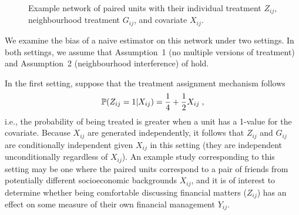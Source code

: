 \documentclass[10pt]{article}
\begin{document}
\begin{figure}[ht]
\centering
{}
\caption{\todo Example network of paired units with their individual treatment $Z_{ij}$, neighbourhood treatment $G_{ij}$, and covariate $X_{ij}$.}
\label{fig:example}
\end{figure}

We examine the bias of a naive estimator on this network under two settings. In both settings, we assume that Assumption~1 (no multiple versions of treatment) and Assumption~2 (neighbourhood interference) of \textcite{Forastiere:2021} hold.

\iffalse
In the first setting, suppose that the treatment assignment mechanism follows
\[
\P(Z_{ij}=1|X_{ij}) = \frac{1}{4} + \frac{1}{2}X_{ij} \;,
\]
i.e., the probability of being treated is greater when a unit has a 1-value for the covariate.
Because $X_{ij}$ are generated independently, it follows that $Z_{ij}$ and $G_{ij}$ are conditionally independent given $X_{ij}$ in this setting (they are independent unconditionally regardless of $X_{ij}$). An example study corresponding to this setting may be one where the paired units correspond to a pair of friends from potentially different socioeconomic backgrounds $X_{ij}$, and it is of interest to determine whether being comfortable discussing financial matters ($Z_{ij}$) has an effect on some measure of their own financial management $Y_{ij}$.
\\
\end{document}

